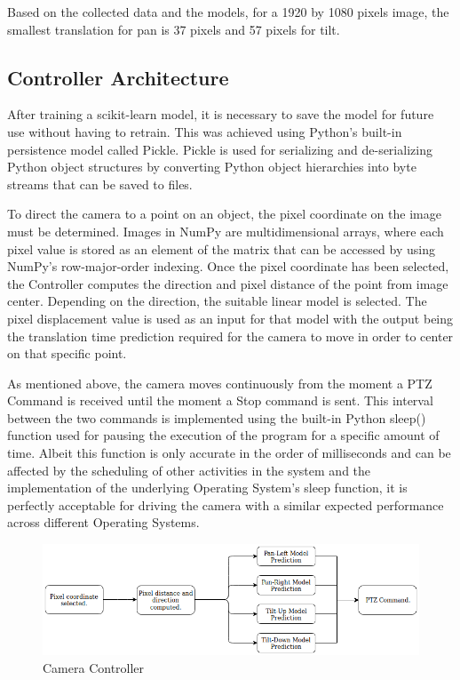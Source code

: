\documentclass{l4proj}
\begin{document}
Based on the collected data and the models, for a 1920 by 1080 pixels image, the smallest translation for pan is 37 pixels and 57 pixels for tilt.




\subsection{Controller Architecture}

After training a scikit-learn model, it is necessary to save the model for future use without having to retrain. This was achieved using Python's built-in persistence model called Pickle. Pickle is used for serializing and de-serializing Python object structures by converting Python object hierarchies into byte streams that can be saved to files.


To direct the camera to a point on an object, the pixel coordinate on the image must be determined. Images in NumPy are multidimensional arrays, where each pixel value is stored as an element of the matrix that can be accessed by using NumPy's row-major-order indexing. Once the pixel coordinate has been selected, the Controller computes the direction and pixel distance of the point from image center. Depending on the direction, the suitable linear model is selected. The pixel displacement value is used as an input for that model with the output being the translation time prediction required for the camera to move in order to center on that specific point.

As mentioned above, the camera moves continuously from the moment a PTZ Command is received until the moment a Stop command is sent. This interval between the two commands is implemented using the built-in Python sleep() function used for pausing the execution of the program for a specific amount of time. Albeit this function is only accurate in the order of milliseconds and can be affected by the scheduling of other activities in the system and the implementation of the underlying Operating System's sleep function, it is perfectly acceptable for driving the camera with a similar expected performance across different Operating Systems.  



\begin{figure}[ht]
    \centering
    \includegraphics[width=1\textwidth]{l4template-master/images/Controller.png}
    \caption{Camera Controller}
    \label{controllerarchitecture}
\end{figure}
\end{document}
